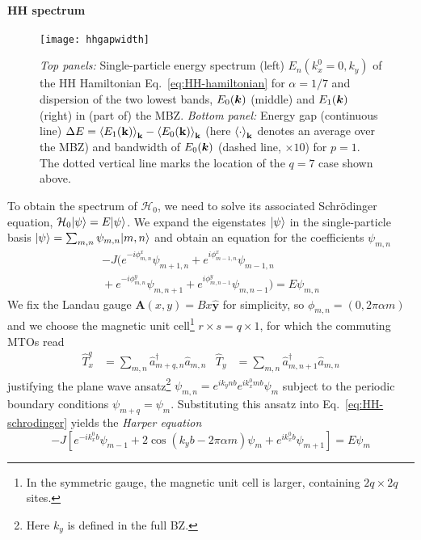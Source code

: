 \paragraph{HH spectrum}
%
\begin{figure}[tb]\centering
  \texttt{[image: hhgapwidth]}
  \caption{
    \emph{Top panels:} Single-particle energy spectrum (left)
    $E_n(k_x^0=0,k_y)$ of the HH Hamiltonian Eq.~\eqref{eq:HH-hamiltonian}
    for $\alpha = 1/7$ and dispersion of the two lowest bands, $E_0(\bm{k})$
    (middle) and $E_1(\bm{k})$ (right) in (part of) the MBZ.  \emph{Bottom
      panel:} Energy gap (continuous line) $\Delta E =
    \left<E_1(\mathbf{k})\right>_{\mathbf{k}} - \left<E_0(\mathbf{k})\right>_{\mathbf{k}}$
    (here $\left<\cdot\right>_{\mathbf{k}}$ denotes an average over the MBZ)
    and bandwidth of $E_0(\bm{k})$ (dashed line, $\times 10$) for $p =
    1$. The dotted vertical line marks the location of the $q = 7$ case
    shown above.
  }\label{fig:hh-energy-levels}
\end{figure}
% 
To obtain the spectrum of $\mathcal{H}_0$, we need to solve its
associated Schr\"odinger equation,
$\mathcal{H}_0\vert \psi \rangle = E\vert \psi \rangle$. We expand the eigenstates
$\vert \psi \rangle$ in the single-particle basis
$\vert \psi \rangle = \sum_{m,n} \psi_{m,n} \vert m,n \rangle$ and obtain an equation
for the coefficients $\psi_{m,n}$
%
\begin{multline}\label{eq:HH-schrodinger}
  -J \big(e^{-i\phi^x_{m,n}}\psi_{m+1,n}+e^{i\phi^x_{m-1,n}}\psi_{m-1,n}\\
  {} + e^{-i\phi^y_{m,n}}\psi_{m,n+1} + e^{i\phi^y_{m,n-1}}\psi_{m,n-1}\big) = E\psi_{m,n}
\end{multline}
% 
We fix the Landau gauge $\bm{A}(x,y)=Bx\hat{\bm{y}}$ for simplicity,
so $\phi_{m,n} = (0,2\pi\alpha m)$ and we choose the magnetic unit
cell\footnote{In the symmetric gauge, the magnetic unit cell is
  larger, containing $2q \times 2q$ sites.}
$r \times s = q \times 1$, for which the commuting MTOs read
%
\begin{align}
  \hat{T}^q_x &= \sum_{m,n} \hat{a}^{\dagger}_{m+q,n} \hat{a}_{m,n} &
  \hat{T}_y &= \sum_{m,n} \hat{a}^{\dagger}_{m,n+1} \hat{a}_{m,n}
\end{align}
%
justifying the plane wave ansatz\footnote{Here $k_y$ is defined in the
  full BZ.}  $\psi_{m,n} = e^{ik_ynb}e^{ik_x^0mb} \psi_m$ subject to
the periodic boundary conditions $\psi_{m+q} = \psi_m$. Substituting
this ansatz into Eq.~\eqref{eq:HH-schrodinger} yields the
\textit{Harper equation}~\cite{Harper_1955}
%
\begin{equation}\label{eq:Harper}
  -J\left[e^{-ik_x^0 b} \psi_{m-1} + 2\cos\left(k_yb - 2\pi\alpha m\right)\psi_m + e^{ik_x^0 b}\psi_{m+1}\right] = E\psi_m
\end{equation}
